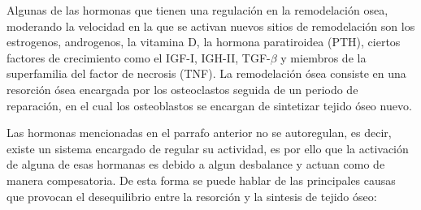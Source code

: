\documentclass[letterpaper,12pt,oneside]{book}
\begin{document}
    \vspace{10pt} 

    Algunas de las hormonas que tienen una regulación en la remodelación osea, moderando la velocidad en la que se activan nuevos sitios de remodelación son los estrogenos, androgenos, la vitamina D, la hormona paratiroidea (PTH), ciertos factores de crecimiento como el IGF-I, IGH-II, TGF-$\beta$ y miembros de la superfamilia del factor de necrosis (TNF). La remodelación ósea consiste en una resorción ósea encargada por los osteoclastos seguida de un periodo de reparación, en el cual los osteoblastos se encargan de sintetizar tejido óseo nuevo.  

    \vspace{10pt}

    Las hormonas mencionadas en el parrafo anterior no se autoregulan, es decir, existe un sistema encargado de regular su actividad, es por ello que la activación de alguna de esas hormanas es debido a algun desbalance y actuan como de manera compesatoria. De esta forma se puede hablar de las principales causas que provocan el desequilibrio entre la resorción y la sintesis de tejido óseo:
\end{document}

